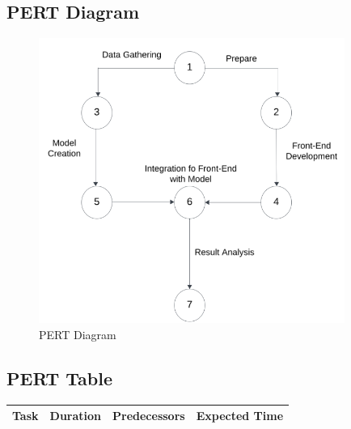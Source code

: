 \documentclass[12pt,a4paper]{report}     %
\begin{document}
\begin{normalsize}
{\begin{itemize}
\subsection{PERT Diagram}
\begin{figure}[h]
    \centering
    \includegraphics[width=10cm]{PERTDig.png}
    \caption{PERT Diagram }
    \label{fig:PERT Diagram}
\end{figure}

\subsection{PERT Table}
\begin{table}[htbp]
\begin{tabular}{|l|c|c|c|}
\hline
\textbf{Task}                                      & \textbf{Duration} & \textbf{Predecessors}      & \textbf{Expected Time} \\
\hline


\end{tabular}
\end{table}
\end{itemize}}
\end{normalsize}
\end{document}
